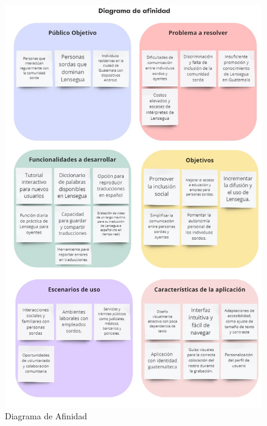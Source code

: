\begin{figure} [H]
    \centering
    \includegraphics[width=1\linewidth]{figuras/diagrama_afinidad.png}
    \caption{Diagrama de Afinidad}
    \label{fig:enter-label}
\end{figure}


